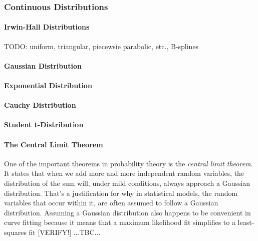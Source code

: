\subsubsection{Continuous Distributions}

\paragraph{Irwin-Hall Distributions} TODO: uniform, triangular, piecewsie parabolic, etc., B-splines

\paragraph{Gaussian Distribution}

\paragraph{Exponential Distribution}

\paragraph{Cauchy Distribution}

\paragraph{Student t-Distribution}


\paragraph{The Central Limit Theorem}
One of the important theorems in probability theory is the \emph{central limit theorem}. It states that when we add more and more independent random variables, the distribution of the sum will, under mild conditions, always approach a Gaussian distribution. That's a justification for why in statistical models, the random variables that occur within it, are often assumed to follow a Gaussian distribution. Assuming a Gaussian distribution also happens to be convenient in curve fitting because it means that a maximum likelihood fit simplifies to a least-squares fit [VERIFY!] ...TBC...





\begin{comment}

Probability is just...really weird
https://www.youtube.com/watch?v=zczGnnM05TQ

- Probability distiributions
  Discrete
  Continuous

- explain some paradoxa - make the point that probability is often counterintuitive

\end{comment}

